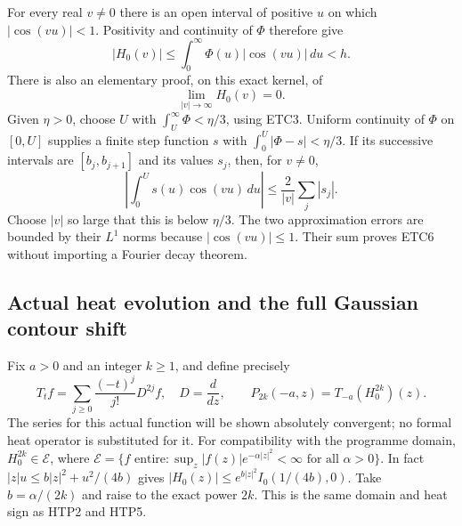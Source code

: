 For every real $v\ne0$ there is an open interval of positive
$u$ on which $|\cos(vu)|<1$. Positivity and continuity of
$\Phi$ therefore give
\begin{equation}\tag{ETC5}
 |H_0(v)|\le\int_0^\infty\Phi(u)|\cos(vu)|\,du<h.
\end{equation}
There is also an elementary proof, on this exact kernel, of
\begin{equation}\tag{ETC6}
                         \lim_{|v|\to\infty}H_0(v)=0.
\end{equation}
Given $\eta>0$, choose $U$ with
$\int_U^\infty\Phi<\eta/3$, using ETC3. Uniform continuity
of $\Phi$ on $[0,U]$ supplies a finite step function $s$
with $\int_0^U|\Phi-s|<\eta/3$. If its successive intervals
are $[b_j,b_{j+1}]$ and its values $s_j$, then, for $v\ne0$,
\[
 \left|\int_0^Us(u)\cos(vu)\,du\right|
 \le\frac{2}{|v|}\sum_j|s_j|.
\]
Choose $|v|$ so large that this is below $\eta/3$.
The two approximation errors are bounded by their
$L^1$ norms because $|\cos(vu)|\le1$. Their sum proves
ETC6 without importing a Fourier decay theorem.

\subsection{Actual heat evolution and the full Gaussian contour shift}

Fix $a>0$ and an integer $k\ge1$, and define precisely
\begin{equation}\tag{ETC7}
 T_tf=\sum_{j\ge0}\frac{(-t)^j}{j!}D^{2j}f,
 \quad D=\frac{d}{dz},\qquad
 P_{2k}(-a,z)=T_{-a}(H_0^{2k})(z).
\end{equation}
The series for this actual function will be shown absolutely
convergent; no formal heat operator is substituted for it.
For compatibility with the programme domain,
$H_0^{2k}\in\mathcal E$, where
$\mathcal E=\{f\text{ entire}:\sup_z|f(z)|e^{-\alpha|z|^2}
<\infty\text{ for all }\alpha>0\}$.
In fact $|z|u\le b|z|^2+u^2/(4b)$ gives
$|H_0(z)|\le e^{b|z|^2}I_0(1/(4b),0)$.
Take $b=\alpha/(2k)$ and raise to the exact power $2k$.
This is the same domain and heat sign as HTP2 and HTP5.

